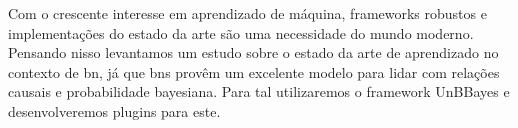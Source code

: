 Com o crescente interesse em aprendizado de máquina, frameworks robustos e implementações do estado da arte são uma necessidade do mundo moderno. Pensando nisso levantamos um estudo sobre o estado da arte de aprendizado no contexto de \gls{bn}, já que \glspl{bn} provêm um excelente modelo para lidar com relações causais e probabilidade bayesiana. Para tal utilizaremos o framework UnBBayes e desenvolveremos plugins para este.
